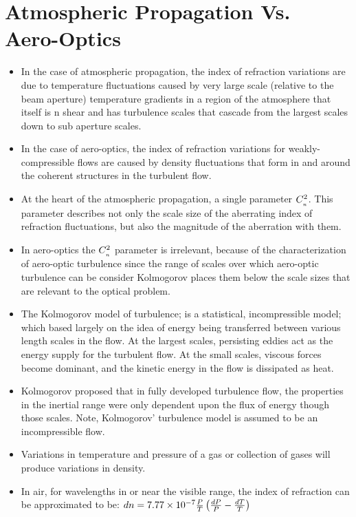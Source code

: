     \section{Atmospheric Propagation Vs. Aero-Optics \cite{siegenthaler:aiaa:2008}} 
        \begin{itemize} 
            \item In the case of atmospheric propagation, the index of refraction variations are due to temperature fluctuations caused by very large scale (relative to the beam aperture) temperature gradients in a region of the atmosphere that itself is n shear and has turbulence scales that cascade from the largest scales down to sub aperture scales.
            \item In the case of aero-optics, the index of refraction variations for weakly-compressible flows are caused by density fluctuations that form in and around the coherent structures in the turbulent flow. 
            \item At the heart of the atmospheric propagation, a single parameter $C_{_{n}}^2$. This parameter describes not only the scale size of the aberrating index of refraction fluctuations, but also the magnitude of the aberration with them. 
            \item In aero-optics the $C_{_{n}}^2$ parameter is irrelevant, because of the characterization of aero-optic turbulence since the range of scales over which aero-optic turbulence can be consider Kolmogorov places them below the scale sizes that are relevant to the optical problem.  
            \item The Kolmogorov model of turbulence; is a statistical, incompressible model; which based largely on the idea of energy being transferred between various length scales in the flow. At the largest scales, persisting eddies act as the energy supply for the turbulent flow. At the small scales, viscous forces become dominant, and the kinetic energy in the flow is dissipated as heat. 
            \item Kolmogorov proposed that in fully developed turbulence flow, the properties in the inertial range were only dependent upon the flux of energy though those scales. Note, Kolmogorov' turbulence model is assumed to be an incompressible flow.  
            \item Variations in temperature and pressure of a gas or collection of gases will produce variations in density.
            \item In air, for wavelengths in or near the visible range, the index of refraction can be approximated to be: $ dn = 7.77\times 10^{-7} \frac{P}{T}\left(\frac{dP}{P} - \frac{dT}{T}\right) $

\end{itemize}
